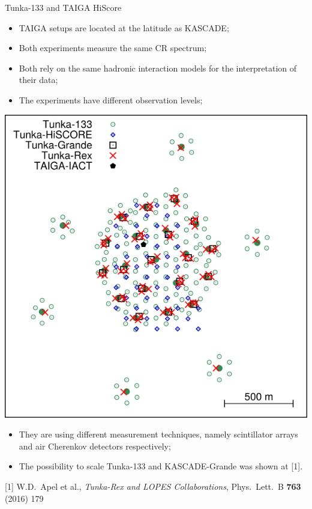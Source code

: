 
%

\begin{frame}{Tunka-133 and TAIGA HiScore}
\begin{minipage}[c]{0.64\textwidth}
\begin{itemize}
  \item TAIGA setups are located at the latitude as KASCADE;
  \item Both experiments measure the same CR spectrum;
  \item Both rely on the same hadronic interaction models for the interpretation of their data;
  \item The experiments have different observation levels;
\end{itemize}
\end{minipage}
\hfill
\begin{minipage}[c]{0.35\textwidth}
\includegraphics[width=1\textwidth]{pics/taiga_map.png}
\end{minipage}
\vspace{-\itemsep}
\begin{itemize}
  \item They are using different measurement techniques, namely scintillator arrays and air Cherenkov detectors respectively;
  \item The possibility to scale Tunka-133 and KASCADE-Grande was shown at [1].
\end{itemize}
[1] W.D.~Apel et al., \textit{Tunka-Rex and LOPES Collaborations}, Phys.\ Lett.\ B \textbf{763} (2016) 179
\end{frame}

